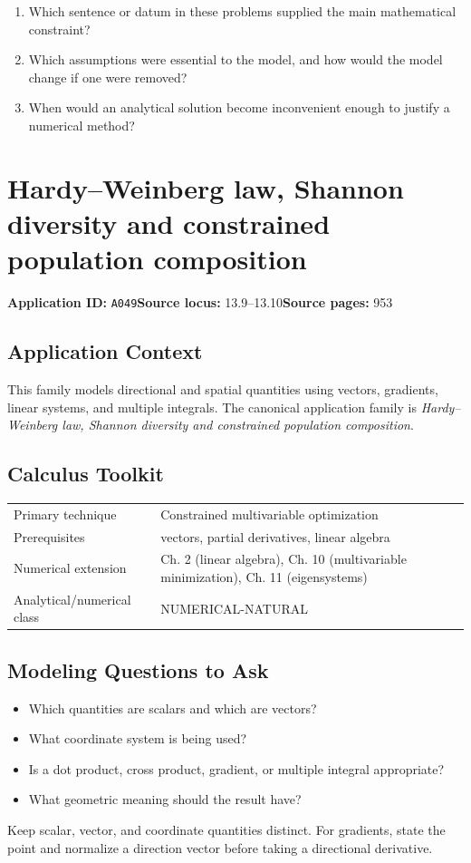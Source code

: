 \documentclass[11pt]{book}
\newcommand{\pid}[1]{\texttt{#1}}
\begin{document}
\begin{reflectionbox}\begin{enumerate}
\item Which sentence or datum in these problems supplied the main mathematical constraint?
\item Which assumptions were essential to the model, and how would the model change if one were removed?
\item When would an analytical solution become inconvenient enough to justify a numerical method?
\end{enumerate}\end{reflectionbox}
\chapter{Hardy–Weinberg law, Shannon diversity and constrained population composition}\label{app:A049}
\textbf{Application ID:} \pid{A049}\quad \textbf{Source locus:} 13.9–13.10\quad \textbf{Source pages:} 953
\section*{Application Context}
This family models directional and spatial quantities using vectors, gradients, linear systems, and multiple integrals. The canonical application family is \emph{Hardy–Weinberg law, Shannon diversity and constrained population composition}.
\section*{Calculus Toolkit}
\begin{tabularx}{\textwidth}{@{}lX@{}}\toprule
Primary technique & Constrained multivariable optimization \\
Prerequisites & vectors, partial derivatives, linear algebra \\
Numerical extension & Ch. 2 (linear algebra), Ch. 10 (multivariable minimization), Ch. 11 (eigensystems) \\
Analytical/numerical class & NUMERICAL-NATURAL \\
\bottomrule\end{tabularx}
\section*{Modeling Questions to Ask}\begin{itemize}
\item Which quantities are scalars and which are vectors?
\item What coordinate system is being used?
\item Is a dot product, cross product, gradient, or multiple integral appropriate?
\item What geometric meaning should the result have?
\end{itemize}
\begin{errorbox}Keep scalar, vector, and coordinate quantities distinct. For gradients, state the point and normalize a direction vector before taking a directional derivative.\end{errorbox}
\end{document}
